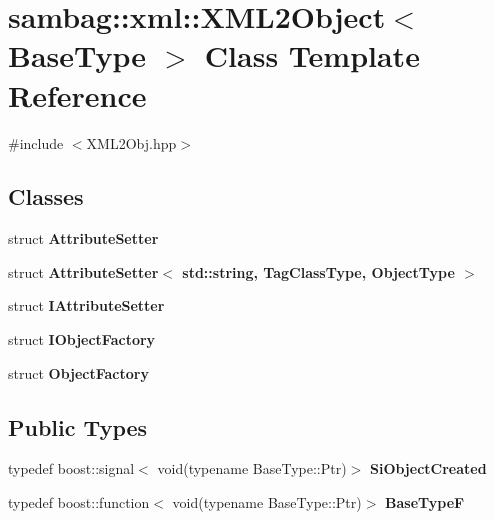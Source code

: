 \hypertarget{classsambag_1_1xml_1_1_x_m_l2_object}{
\section{sambag::xml::XML2Object$<$ BaseType $>$ Class Template Reference}
\label{classsambag_1_1xml_1_1_x_m_l2_object}
}


{\ttfamily \#include $<$XML2Obj.hpp$>$}

\subsection*{Classes}
\begin{DoxyCompactItemize}
\item 
struct {\bfseries AttributeSetter}
\item 
struct {\bfseries AttributeSetter$<$ std::string, TagClassType, ObjectType $>$}
\item 
struct {\bfseries IAttributeSetter}
\item 
struct {\bfseries IObjectFactory}
\item 
struct {\bfseries ObjectFactory}
\end{DoxyCompactItemize}
\subsection*{Public Types}
\begin{DoxyCompactItemize}
\item 
\hypertarget{classsambag_1_1xml_1_1_x_m_l2_object_a52df8bea6f71602d16a8af4e66879c95}{
typedef boost::signal$<$ void(typename BaseType::Ptr)$>$ {\bfseries SiObjectCreated}}
\label{classsambag_1_1xml_1_1_x_m_l2_object_a52df8bea6f71602d16a8af4e66879c95}

\item 
\hypertarget{classsambag_1_1xml_1_1_x_m_l2_object_a94263e4ae315299e2fcf10b0f682b7ca}{
typedef boost::function$<$ void(typename BaseType::Ptr)$>$ {\bfseries BaseTypeF}}
\label{classsambag_1_1xml_1_1_x_m_l2_object_a94263e4ae315299e2fcf10b0f682b7ca}

\end{DoxyCompactItemize}
